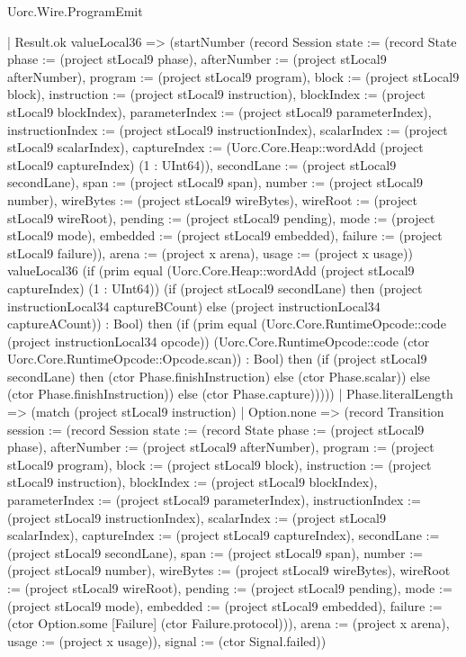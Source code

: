 \begin{lexlean}{Uorc.Wire.ProgramEmit}
\begin{semanticmodule}
{            | Result.ok valueLocal36 => (startNumber (record Session {state := (record State {phase := (project stLocal9 phase), afterNumber := (project stLocal9 afterNumber), program := (project stLocal9 program), block := (project stLocal9 block), instruction := (project stLocal9 instruction), blockIndex := (project stLocal9 blockIndex), parameterIndex := (project stLocal9 parameterIndex), instructionIndex := (project stLocal9 instructionIndex), scalarIndex := (project stLocal9 scalarIndex), captureIndex := (Uorc.Core.Heap::wordAdd (project stLocal9 captureIndex) (1 : UInt64)), secondLane := (project stLocal9 secondLane), span := (project stLocal9 span), number := (project stLocal9 number), wireBytes := (project stLocal9 wireBytes), wireRoot := (project stLocal9 wireRoot), pending := (project stLocal9 pending), mode := (project stLocal9 mode), embedded := (project stLocal9 embedded), failure := (project stLocal9 failure)}), arena := (project x arena), usage := (project x usage)}) valueLocal36 (if (prim equal (Uorc.Core.Heap::wordAdd (project stLocal9 captureIndex) (1 : UInt64)) (if (project stLocal9 secondLane) then (project instructionLocal34 captureBCount) else (project instructionLocal34 captureACount)) : Bool) then (if (prim equal (Uorc.Core.RuntimeOpcode::code (project instructionLocal34 opcode)) (Uorc.Core.RuntimeOpcode::code (ctor Uorc.Core.RuntimeOpcode::Opcode.scan)) : Bool) then (if (project stLocal9 secondLane) then (ctor Phase.finishInstruction) else (ctor Phase.scalar)) else (ctor Phase.finishInstruction)) else (ctor Phase.capture)))))
        | Phase.literalLength => (match (project stLocal9 instruction)
          | Option.none => (record Transition {session := (record Session {state := (record State {phase := (project stLocal9 phase), afterNumber := (project stLocal9 afterNumber), program := (project stLocal9 program), block := (project stLocal9 block), instruction := (project stLocal9 instruction), blockIndex := (project stLocal9 blockIndex), parameterIndex := (project stLocal9 parameterIndex), instructionIndex := (project stLocal9 instructionIndex), scalarIndex := (project stLocal9 scalarIndex), captureIndex := (project stLocal9 captureIndex), secondLane := (project stLocal9 secondLane), span := (project stLocal9 span), number := (project stLocal9 number), wireBytes := (project stLocal9 wireBytes), wireRoot := (project stLocal9 wireRoot), pending := (project stLocal9 pending), mode := (project stLocal9 mode), embedded := (project stLocal9 embedded), failure := (ctor Option.some [Failure] (ctor Failure.protocol))}), arena := (project x arena), usage := (project x usage)}), signal := (ctor Signal.failed)})
}
\end{semanticmodule}
\end{lexlean}
